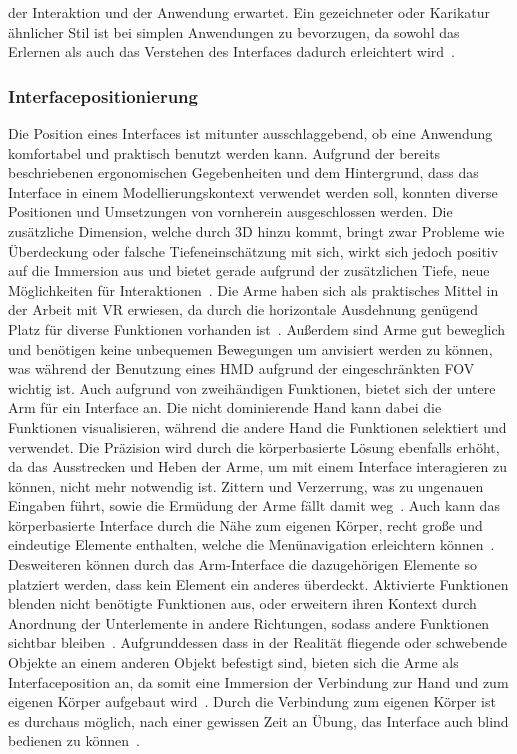 der Interaktion und der Anwendung erwartet. Ein gezeichneter oder Karikatur ähnlicher Stil ist bei simplen Anwendungen zu bevorzugen, da sowohl das Erlernen als auch das Verstehen des Interfaces dadurch erleichtert wird~\cite{theoryandpracticebook}.

\subsubsection{Interfacepositionierung}
Die Position eines Interfaces ist mitunter ausschlaggebend, ob eine Anwendung komfortabel und praktisch benutzt werden kann. Aufgrund der be\-reits beschriebenen ergonomischen Gegebenheiten und dem Hintergrund, dass das Interface in einem Modellierungskontext verwendet werden soll, konn\-ten diverse Positionen und Umsetzungen von vornherein ausgeschlossen werden. Die zusätzliche Dimension, welche durch 3D hinzu kommt, bringt zwar Probleme wie Überdeckung oder falsche Tiefeneinschätzung mit sich, wirkt sich jedoch positiv auf die Immersion aus und bietet gerade aufgrund der zusätzlichen Tiefe, neue Möglichkeiten für Interaktionen~\cite{constraints3duis}. Die Arme haben sich als praktisches Mittel in der Arbeit mit VR erwiesen, da durch die horizontale Ausdehnung genügend Platz für diverse Funktionen vorhanden ist~\cite{skinput}. Außerdem sind Arme gut beweglich und benötigen keine unbequemen Bewegungen um anvisiert werden zu können, was während der Benutzung eines HMD aufgrund der eingeschränkten FOV wichtig ist. Auch aufgrund von zweihändigen Funktionen, bietet sich der untere Arm für ein Interface an. Die nicht dominierende Hand kann dabei die Funktionen visualisieren, während die andere Hand die Funktionen selektiert und verwendet. Die Präzision wird durch die körperbasierte Lösung ebenfalls erhöht, da das Ausstrecken und Heben der Arme, um mit einem Interface interagieren zu können, nicht mehr notwendig ist. Zittern und Verzerrung, was zu ungenauen Eingaben führt, sowie die Ermüdung der Arme fällt damit weg~\cite{theoryandpracticebook,anintroductionto3dspacial,consumedindurance}. Auch kann das körperbasierte Interface durch die Nähe zum eigenen Körper, recht große und eindeutige Elemente enthalten, welche die Menünavigation erleichtern können~\cite{constraints3duis}. Desweiteren können durch das Arm-Interface die dazugehörigen Elemente so platziert werden, dass kein Element ein anderes überdeckt. Aktivierte Funktionen blenden nicht benötigte Funktionen aus, oder erweitern ihren Kontext durch Anordnung der Unterlemente in andere Richtungen, sodass andere Funktionen sichtbar bleiben~\cite{implicationsoflocation}.
Aufgrunddessen dass in der Rea\-lität fliegende oder schwebende Objekte an einem anderen Objekt befestigt sind, bieten sich die Arme als Interfaceposition an, da somit eine Immersion der Verbindung zur Hand und zum eigenen Körper aufgebaut wird~\cite{constraints3duis}.
Durch die Verbindung zum eigenen Körper ist es durchaus möglich, nach einer gewissen Zeit an Übung, das Interface auch blind bedienen zu können~\cite{theoryandpracticebook}.

